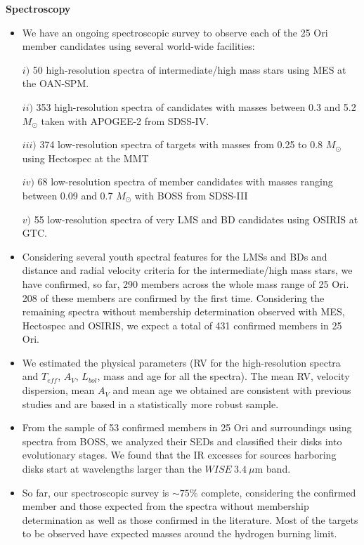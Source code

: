 \documentclass[12pt]{article}
\begin{document}
{\bf Spectroscopy}
\begin{itemize}
	\item We have an ongoing spectroscopic survey to observe each of the 25 Ori member candidates using several world-wide facilities: \par %
		$i)$ 50 high-resolution spectra of intermediate/high mass stars using MES at the OAN-SPM. \par
		$ii)$ 353 high-resolution spectra of candidates with masses between 0.3 and 5.2 $M_\odot$ taken with APOGEE-2 from SDSS-IV. \par
		$iii)$ 374 low-resolution spectra of targets with masses from 0.25 to 0.8 $M_\odot$ using Hectospec at the MMT \par
		$iv)$ 68 low-resolution spectra of member candidates with masses ranging between 0.09 and 0.7 $M_\odot$ with BOSS from SDSS-III \par
		$v)$ 55 low-resolution spectra of very LMS and BD candidates using OSIRIS at GTC.
	\item Considering several youth spectral features for the LMSs and BDs and distance and radial velocity criteria for the intermediate/high mass stars, we have confirmed, so far, 290 members across the whole mass range of 25 Ori. 208 of these members are confirmed by the first time. Considering the remaining spectra without membership determination observed with MES, Hectospec and OSIRIS, we expect a total of 431 confirmed members in 25 Ori.
	\item We estimated the physical parameters (RV for the high-resolution spectra and $T_{eff}$, $A_V$, $L_{bol}$, mass and age for all the spectra). The mean RV, velocity dispersion, mean $A_V$ and mean age we obtained are consistent with previous studies and are based in a statistically more robust sample.
	\item From the sample of 53 confirmed members in 25 Ori and surroundings using spectra from BOSS, we analyzed their SEDs and classified their disks into evolutionary stages. We found that the IR excesses for sources harboring disks start at wavelengths larger than the $WISE\ 3.4\ \mu$m band.
	\item So far, our spectroscopic survey is $\sim75\%$ complete, considering the confirmed member and those expected from the spectra without membership determination as well as those confirmed in the literature. Most of the targets to be observed have expected masses around the hydrogen burning limit.
\end{itemize}
\end{document}
